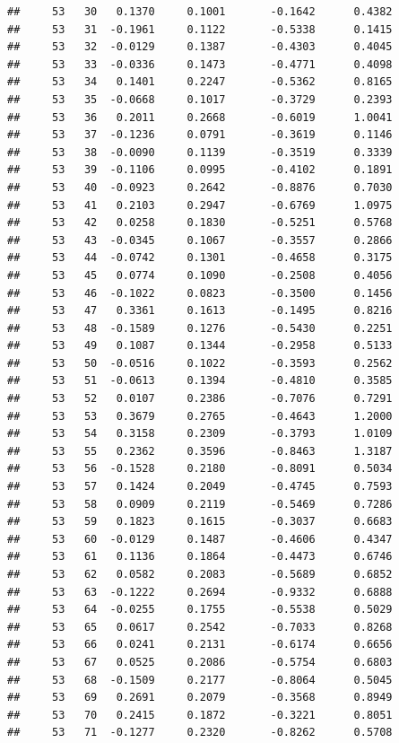\documentclass[
]{article}
\begin{document}
\begin{verbatim}
##     53   30   0.1370     0.1001       -0.1642      0.4382  
##     53   31  -0.1961     0.1122       -0.5338      0.1415  
##     53   32  -0.0129     0.1387       -0.4303      0.4045  
##     53   33  -0.0336     0.1473       -0.4771      0.4098  
##     53   34   0.1401     0.2247       -0.5362      0.8165  
##     53   35  -0.0668     0.1017       -0.3729      0.2393  
##     53   36   0.2011     0.2668       -0.6019      1.0041  
##     53   37  -0.1236     0.0791       -0.3619      0.1146  
##     53   38  -0.0090     0.1139       -0.3519      0.3339  
##     53   39  -0.1106     0.0995       -0.4102      0.1891  
##     53   40  -0.0923     0.2642       -0.8876      0.7030  
##     53   41   0.2103     0.2947       -0.6769      1.0975  
##     53   42   0.0258     0.1830       -0.5251      0.5768  
##     53   43  -0.0345     0.1067       -0.3557      0.2866  
##     53   44  -0.0742     0.1301       -0.4658      0.3175  
##     53   45   0.0774     0.1090       -0.2508      0.4056  
##     53   46  -0.1022     0.0823       -0.3500      0.1456  
##     53   47   0.3361     0.1613       -0.1495      0.8216  
##     53   48  -0.1589     0.1276       -0.5430      0.2251  
##     53   49   0.1087     0.1344       -0.2958      0.5133  
##     53   50  -0.0516     0.1022       -0.3593      0.2562  
##     53   51  -0.0613     0.1394       -0.4810      0.3585  
##     53   52   0.0107     0.2386       -0.7076      0.7291  
##     53   53   0.3679     0.2765       -0.4643      1.2000  
##     53   54   0.3158     0.2309       -0.3793      1.0109  
##     53   55   0.2362     0.3596       -0.8463      1.3187  
##     53   56  -0.1528     0.2180       -0.8091      0.5034  
##     53   57   0.1424     0.2049       -0.4745      0.7593  
##     53   58   0.0909     0.2119       -0.5469      0.7286  
##     53   59   0.1823     0.1615       -0.3037      0.6683  
##     53   60  -0.0129     0.1487       -0.4606      0.4347  
##     53   61   0.1136     0.1864       -0.4473      0.6746  
##     53   62   0.0582     0.2083       -0.5689      0.6852  
##     53   63  -0.1222     0.2694       -0.9332      0.6888  
##     53   64  -0.0255     0.1755       -0.5538      0.5029  
##     53   65   0.0617     0.2542       -0.7033      0.8268  
##     53   66   0.0241     0.2131       -0.6174      0.6656  
##     53   67   0.0525     0.2086       -0.5754      0.6803  
##     53   68  -0.1509     0.2177       -0.8064      0.5045  
##     53   69   0.2691     0.2079       -0.3568      0.8949  
##     53   70   0.2415     0.1872       -0.3221      0.8051  
##     53   71  -0.1277     0.2320       -0.8262      0.5708  

\end{verbatim}
\end{document}
